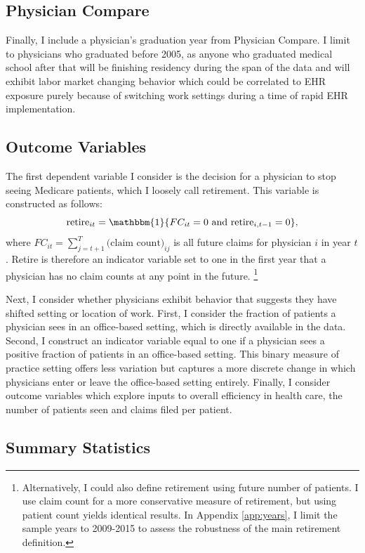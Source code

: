\documentclass[12pt]{article}
\begin{document}
\subsection{Physician Compare}

Finally, I include a physician's graduation year from Physician Compare. I limit to physicians who graduated before 2005, as anyone who graduated medical school after that will be finishing residency during the span of the data and will exhibit labor market changing behavior which could be correlated to EHR exposure purely because of switching work settings during a time of rapid EHR implementation.

\subsection{Outcome Variables}\label{sec:outcome}

The first dependent variable I consider is the decision for a physician to stop seeing Medicare patients, which I loosely call retirement. This variable is constructed as follows: 
$$\text{retire}_{it}=\mathbbm{1}\{FC_{it}=0 \text{ and retire}_{i,t-1}=0\}, $$
where $FC_{it}=\sum\limits_{j=t+1}^T\text{(claim count)}_{ij}$ is all future claims for physician $i$ in year $t$. Retire is therefore an indicator variable set to one in the first year that a physician has no claim counts at any point in the future. \footnote{Alternatively, I could also define retirement using future number of patients. I use claim count for a more conservative measure of retirement, but using patient count yields identical results. In Appendix \ref{app:years}, I limit the sample years to 2009-2015 to assess the robustness of the main retirement definition.}

Next, I consider whether physicians exhibit behavior that suggests they have shifted setting or location of work. First, I consider the fraction of patients a physician sees in an office-based setting, which is directly available in the data. Second, I construct an indicator variable equal to one if a physician sees a positive fraction of patients in an office-based setting. This binary measure of practice setting offers less variation but captures a more discrete change in which physicians enter or leave the office-based setting entirely. Finally, I consider outcome variables which explore inputs to overall efficiency in health care, the number of patients seen and claims filed per patient.


\subsection{Summary Statistics}
\end{document}
